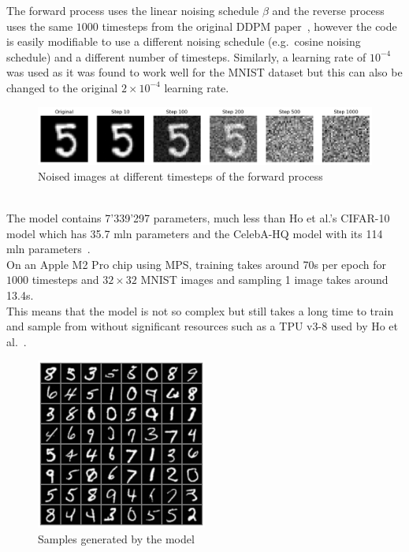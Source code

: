 \documentclass{article}
\numberwithin{equation}{section}
\numberwithin{figure}{section}
\begin{document}
The forward process uses the linear noising schedule $\beta$ and the reverse process uses the same $1000$ timesteps from the original DDPM paper~\cite{ho2020denoising}, however the code is easily modifiable to use a different noising schedule (e.g.\ cosine noising schedule) and a different number of timesteps. Similarly, a learning rate of $10^{-4}$ was used as it was found to work well for the MNIST dataset but this can also be changed to the original $2 \times 10^{-4}$ learning rate.
\begin{figure}[h]
  \begin{center}
    \includegraphics[width=\textwidth]{images/forward.png}
    \caption{Noised images at different timesteps of the forward process}
  \end{center}
\end{figure}
\\
The model contains 7'339'297 parameters, much less than Ho et al.'s CIFAR-10 model which has 35.7 mln parameters and the CelebA-HQ model with its 114 mln parameters~\cite{ho2020denoising}. \\
On an Apple M2 Pro chip using MPS, training takes around 70s per epoch for $1000$ timesteps and $32 \times 32$ MNIST images and sampling 1 image takes around 13.4s. \\
This means that the model is not so complex but still takes a long time to train and sample from without significant resources such as a TPU v3-8 used by Ho et al.~\cite{ho2020denoising}.
\newpage
\begin{figure}[h]
  \begin{center}
    \includegraphics[width=0.5\textwidth]{images/sample.png}
    \caption{Samples generated by the model}
  \end{center}
\end{figure}
\end{document}
